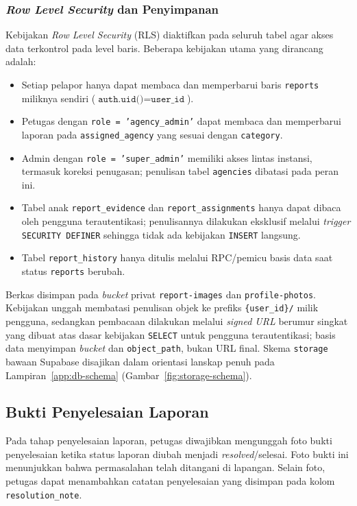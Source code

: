 \subsubsection{\textit{Row Level Security} dan Penyimpanan}

Kebijakan \textit{Row Level Security} (RLS) diaktifkan pada seluruh tabel agar akses data terkontrol pada level baris. Beberapa kebijakan utama yang dirancang adalah:

\begin{itemize}
    \item Setiap pelapor hanya dapat membaca dan memperbarui baris \texttt{reports} miliknya sendiri (\(\texttt{auth.uid()} = \texttt{user\_id}\)).
    \item Petugas dengan \texttt{role = 'agency\_admin'} dapat membaca dan memperbarui laporan pada \texttt{assigned\_agency} yang sesuai dengan \texttt{category}.
    \item Admin dengan \texttt{role = 'super\_admin'} memiliki akses lintas instansi, termasuk koreksi penugasan; penulisan tabel \texttt{agencies} dibatasi pada peran ini.
    \item Tabel anak \texttt{report\_evidence} dan \texttt{report\_assignments} hanya dapat dibaca oleh pengguna terautentikasi; penulisannya dilakukan eksklusif melalui \textit{trigger} \texttt{SECURITY DEFINER} sehingga tidak ada kebijakan \texttt{INSERT} langsung.
    \item Tabel \texttt{report\_history} hanya ditulis melalui RPC/pemicu basis data saat status \texttt{reports} berubah.
\end{itemize}

Berkas disimpan pada \textit{bucket} privat \texttt{report-images} dan \texttt{profile-photos}. Kebijakan unggah membatasi penulisan objek ke prefiks \texttt{\{user\_id\}/} milik pengguna, sedangkan pembacaan dilakukan melalui \textit{signed URL} berumur singkat yang dibuat atas dasar kebijakan \texttt{SELECT} untuk pengguna terautentikasi; basis data menyimpan \textit{bucket} dan \texttt{object\_path}, bukan URL final. Skema \texttt{storage} bawaan Supabase disajikan dalam orientasi lanskap penuh pada Lampiran~\ref{app:db-schema} (Gambar~\ref{fig:storage-schema}).

\subsection{Bukti Penyelesaian Laporan}

Pada tahap penyelesaian laporan, petugas diwajibkan mengunggah foto bukti penyelesaian ketika status laporan diubah menjadi \textit{resolved}/selesai. Foto bukti ini menunjukkan bahwa permasalahan telah ditangani di lapangan. Selain foto, petugas dapat menambahkan catatan penyelesaian yang disimpan pada kolom \texttt{resolution\_note}.


